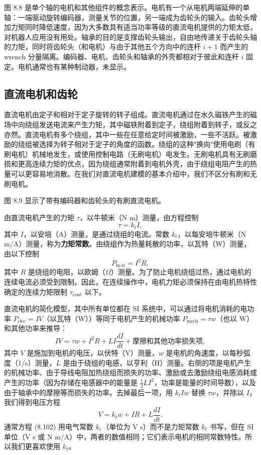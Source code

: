 \documentclass[12pt,a4paper]{article}
\begin{document}
图 8.8 是单个轴的电机和其他组件的概念表示。电机有一个从电机两端延伸的单轴：一端驱动旋转编码器，测量关节的位置，另一端成为齿轮头的输入。齿轮头增加力矩同时降低速度，因为大多数具有适当功率等级的直流电机提供的力矩太低，对机器人应用没有用处。轴承的目的是支撑齿轮头输出，自由地传递关于齿轮头轴的力矩，同时将齿轮头（和电机）与由于其他五个方向中的连杆 $i+1$ 而产生的 wrench 分量隔离。编码器、电机、齿轮头和轴承的外壳都相对于彼此和连杆 $i$ 固定。电机通常也有某种制动器，未显示。

\subsection{直流电机和齿轮}
直流电机由定子和相对于定子旋转的转子组成。直流电机通过在水久磁铁产生的磁场中向绕组发送电流来产生力矩，其中磁铁附着到定子，绕组附着到转子，或反之亦然。直流电机有多个绕组，其中一些在任意给定时间被激励，一些不活跃。被激励的绕组被选择为转子相对于定子的角度的函数。绕组的这种"换向"使用电刷（有刷电机）机械地发生，或使用控制电路（无刷电机）电发生。无刷电机具有无刷磨损和更高连续力矩的优点，因为绕组通常附着到电机外壳，由于绕组电阻产生的热量可以更容易地消散。在我们对直流电机建模的基本介绍中，我们不区分有刷和无刷电机。

图 8.9 显示了带有编码器和齿轮头的有刷直流电机。

由直流电机产生的力矩 $\tau$，以牛顿米（N m）测量，由方程控制
\begin{equation}
\tau = k_t I,
\end{equation}
其中 $I$，以安培（A）测量，是通过绕组的电流。常数 $k_t$，以每安培牛顿米（N m/A）测量，称为\textbf{力矩常数}。由绕组作为热量耗散的功率，以瓦特（W）测量，由以下控制
\begin{equation}
P_{\text{heat}} = I^2 R,
\end{equation}
其中 $R$ 是绕组的电阻，以欧姆（$\Omega$）测量。为了防止电机绕组过热，通过电机的连续电流必须受到限制。因此，在连续操作中，电机力矩必须保持在由电机热特性确定的连续力矩限制 $\tau_{\text{cont}}$ 以下。

直流电机的简化模型，其中所有单位都在 SI 系统中，可以通过将电机消耗的电功率 $P_{\text{elec}} = IV$（以瓦特（W））等同于电机产生的机械功率 $P_{\text{mech}} = \tau w$（也以 W）和其他功率来推导：
\begin{equation}
IV = \tau w + I^2 R + LI\frac{dI}{dt} + \text{摩擦和其他功率损失项},
\end{equation}
其中 $V$ 是施加到电机的电压，以伏特（V）测量，$w$ 是电机的角速度，以每秒弧度（1/s）测量，$L$ 是由于绕组的电感，以亨利（H）测量。右侧的项是电机产生的机械功率、由于导线电阻加热绕组而损失的功率、激励或去激励绕组电感消耗或产生的功率（因为存储在电感器中的能量是 $\frac{1}{2}LI^2$，功率是能量的时间导数），以及由于轴承中的摩擦等而损失的功率。去掉最后一项，用 $k_t Iw$ 替换 $\tau w$，并除以 $I$，我们得到电压方程
\begin{equation}
V = k_t w + IR + L\frac{dI}{dt}. \label{eq:8.102}
\end{equation}
通常方程 (8.102) 用电气常数 $k_e$（单位为 V s）而不是力矩常数 $k_t$ 书写，但在 SI 单位（V s 或 N m/A）中，两者的数值相同；它们表示电机的相同常数特性。所以我们更喜欢使用 $k_t$。
\end{document}
